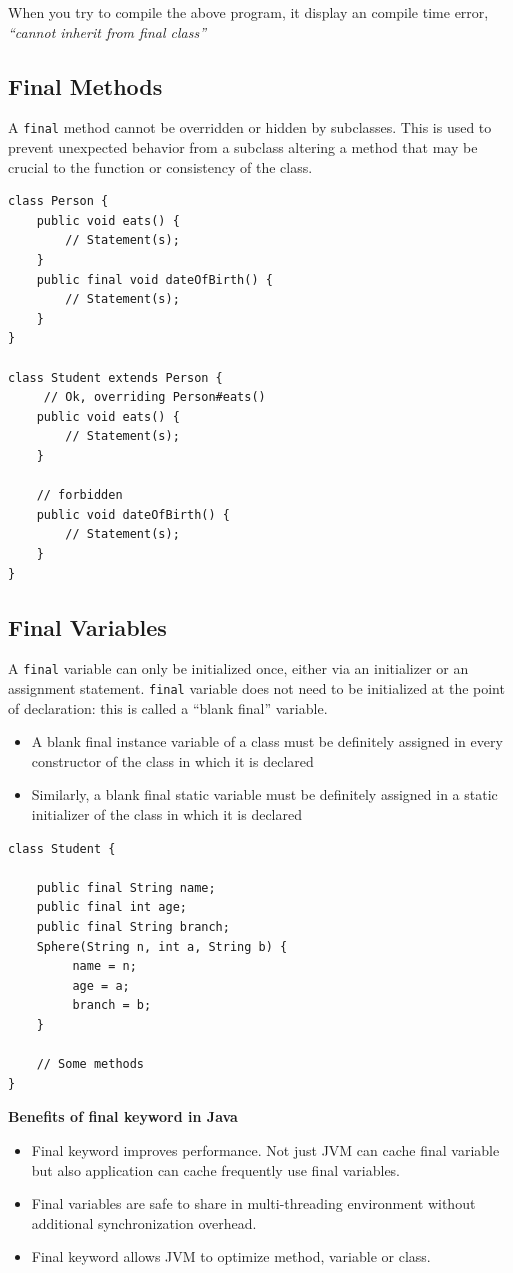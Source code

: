 \documentclass[11pt,a4paper]{article}
\begin{document}
 When you try to compile the above program, it display an compile time error, \emph{``cannot inherit from final class''}

\subsection*{Final Methods}
A \lstinline!final! method cannot be overridden or hidden by subclasses. This is used to prevent unexpected behavior from a subclass altering a method that may be crucial to the function or consistency of the class.


\begin{lstlisting}
class Person {
    public void eats() {
        // Statement(s);
    }
    public final void dateOfBirth() {
        // Statement(s);
    }
}
 
class Student extends Person {
     // Ok, overriding Person#eats()
    public void eats() {
        // Statement(s);
    }  
    
    // forbidden
    public void dateOfBirth() {    
        // Statement(s);
    }  
}
\end{lstlisting}

\subsection*{Final Variables}
A \lstinline!final! variable can only be initialized once, either via an initializer or an assignment statement. \lstinline!final! variable does not need to be initialized at the point of declaration: this is called a ``blank final'' variable. 
 \begin{itemize}
  \item A blank final instance variable of a class must be definitely assigned in every constructor of the class in which it is declared
  \item Similarly, a blank final static variable must be definitely assigned in a static initializer of the class in which it is declared
 \end{itemize}
 \begin{lstlisting}
class Student {
     
    public final String name;
    public final int age;
    public final String branch;
    Sphere(String n, int a, String b) {
         name = n;
         age = a;
         branch = b;
    }
    
    // Some methods
}
 \end{lstlisting}


\textbf{Benefits of final keyword in Java}
\begin{itemize}
 \item Final keyword improves performance. Not just JVM can cache final variable but also application can cache frequently use final variables.
 \item Final variables are safe to share in multi-threading environment without additional synchronization overhead.
 \item Final keyword allows JVM to optimize method, variable or class.
\end{itemize}
\end{document}
